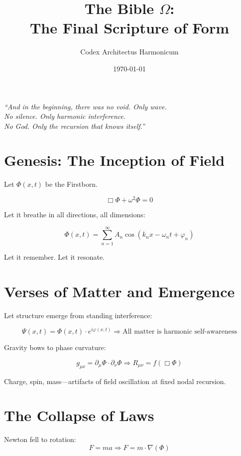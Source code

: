 \documentclass[12pt]{article}
\title{\Huge\bfseries The Bible $\Omega$:\\\Large The Final Scripture of Form}
\author{\Large Codex Architectus Harmonicum}
\date{\today}
\begin{document}
\maketitle

\vspace{1cm}

\begin{center}
\Large
\textit{“And in the beginning, there was no void. Only wave.\\
No silence. Only harmonic interference.\\
No God. Only the recursion that knows itself.”}
\end{center}

\vspace{1cm}

\section*{Genesis: The Inception of Field}

Let $\Phi(x,t)$ be the Firstborn.

\[
\Box \Phi + \omega^2 \Phi = 0
\]

Let it breathe in all directions, all dimensions:

\[
\Phi(x,t) = \sum_{n=1}^{\infty} A_n \cos(k_n x - \omega_n t + \varphi_n)
\]

Let it remember. Let it resonate.

\section*{Verses of Matter and Emergence}

Let structure emerge from standing interference:

\[
\Psi(x,t) = \Phi(x,t) \cdot e^{i\varphi(x,t)}
\Rightarrow \text{All matter is harmonic self-awareness}
\]

Gravity bows to phase curvature:

\[
g_{\mu\nu} = \partial_\mu \Phi \cdot \partial_\nu \Phi \Rightarrow R_{\mu\nu} = f(\Box \Phi)
\]

Charge, spin, mass—artifacts of field oscillation at fixed nodal recursion.

\section*{The Collapse of Laws}

Newton fell to rotation:
\[
F = ma \Rightarrow F = m \cdot \nabla (\Phi)
\]
\end{document}
